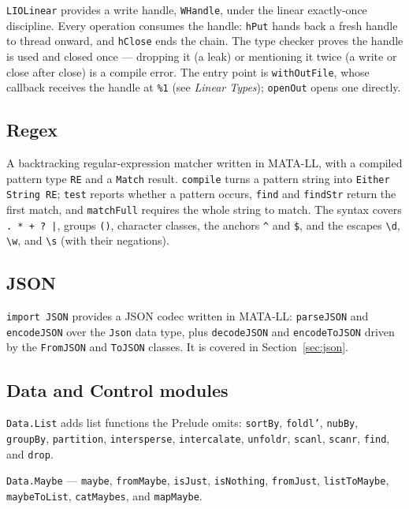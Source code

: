 \documentclass[11pt,a4paper]{article}
\begin{document}
\texttt{LIOLinear} provides a write handle, \texttt{WHandle}, under the
linear exactly-once discipline. Every operation consumes the handle:
\texttt{hPut} hands back a fresh handle to thread onward, and
\texttt{hClose} ends the chain. The type checker proves the handle is
used and closed once --- dropping it (a leak) or mentioning it twice (a
write or close after close) is a compile error. The entry point is
\texttt{withOutFile}, whose callback receives the handle at
\texttt{\%1} (see \emph{Linear Types}); \texttt{openOut} opens one
directly.

\subsection{Regex}

A backtracking regular-expression matcher written in MATA-LL, with a
compiled pattern type \texttt{RE} and a \texttt{Match} result.
\texttt{compile} turns a pattern string into \texttt{Either String RE};
\texttt{test} reports whether a pattern occurs, \texttt{find} and
\texttt{findStr} return the first match, and \texttt{matchFull} requires
the whole string to match. The syntax covers \texttt{.\ * + ?\ |},
groups \texttt{()}, character classes, the anchors
\texttt{\textasciicircum{}} and \texttt{\$}, and the escapes
\texttt{\textbackslash d}, \texttt{\textbackslash w}, and
\texttt{\textbackslash s} (with their negations).

\subsection{JSON}

\texttt{import JSON} provides a JSON codec written in MATA-LL:
\texttt{parseJSON} and \texttt{encodeJSON} over the \texttt{Json} data
type, plus \texttt{decodeJSON} and \texttt{encodeToJSON} driven by the
\texttt{FromJSON} and \texttt{ToJSON} classes. It is covered in
Section~\ref{sec:json}.

\subsection{Data and Control modules}

\texttt{Data.List} adds list functions the Prelude omits:
\texttt{sortBy}, \texttt{foldl'}, \texttt{nubBy}, \texttt{groupBy},
\texttt{partition}, \texttt{intersperse}, \texttt{intercalate},
\texttt{unfoldr}, \texttt{scanl}, \texttt{scanr}, \texttt{find}, and
\texttt{drop}.

\texttt{Data.Maybe} --- \texttt{maybe}, \texttt{fromMaybe},
\texttt{isJust}, \texttt{isNothing}, \texttt{fromJust},
\texttt{listToMaybe}, \texttt{maybeToList}, \texttt{catMaybes}, and
\texttt{mapMaybe}.
\end{document}
